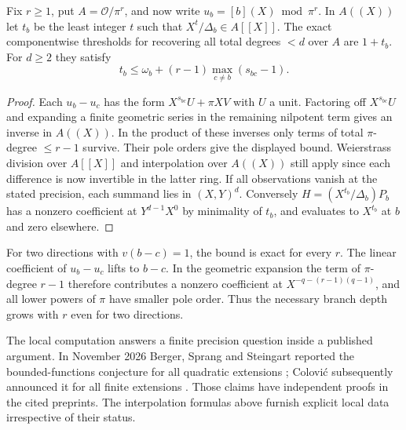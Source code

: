 \begin{proposition}\label{prop:integralbranch}
Fix $r\ge1$, put $A=\mathcal O/\pi^r$, and now write $u_b=[b](X)\bmod\pi^r$. In $A((X))$ let $t_b$ be the least integer $t$ such that $X^t/\Delta_b\in A[[X]]$. The exact componentwise thresholds for recovering all total degrees $<d$ over $A$ are $1+t_b$. For $d\ge2$ they satisfy
\[
 t_b\le \omega_b+(r-1)\max_{c\ne b}(s_{bc}-1).
\]
\end{proposition}
\begin{proof}
Each $u_b-u_c$ has the form $X^{s_{bc}}U+\pi XV$ with $U$ a unit. Factoring off $X^{s_{bc}}U$ and expanding a finite geometric series in the remaining nilpotent term gives an inverse in $A((X))$. In the product of these inverses only terms of total $\pi$-degree $\le r-1$ survive. Their pole orders give the displayed bound. Weierstrass division over $A[[X]]$ and interpolation over $A((X))$ still apply since each difference is now invertible in the latter ring. If all observations vanish at the stated precision, each summand lies in $(X,Y)^d$. Conversely $H=(X^{t_b}/\Delta_b)P_b$ has a nonzero coefficient at $Y^{d-1}X^0$ by minimality of $t_b$, and evaluates to $X^{t_b}$ at $b$ and zero elsewhere.
\end{proof}
For two directions with $v(b-c)=1$, the bound is exact for every $r$. The linear coefficient of $u_b-u_c$ lifts to $b-c$. In the geometric expansion the term of $\pi$-degree $r-1$ therefore contributes a nonzero coefficient at $X^{-q-(r-1)(q-1)}$, and all lower powers of $\pi$ have smaller pole order. Thus the necessary branch depth grows with $r$ even for two directions.

The local computation answers a finite precision question inside a published argument. In November 2026 Berger, Sprang and Steingart reported the bounded-functions conjecture for all quadratic extensions \cite{BSS}; Colovi\'c subsequently announced it for all finite extensions \cite{Colovic}. Those claims have independent proofs in the cited preprints. The interpolation formulas above furnish explicit local data irrespective of their status.

